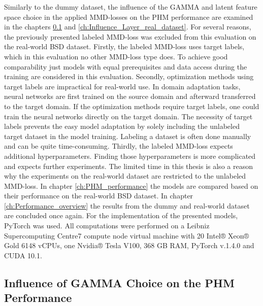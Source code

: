 Similarly to the dummy dataset, the influence of the GAMMA and latent feature space choice in the applied MMD-losses on the PHM performance are examined in the chapters \ref{ch:Influence_GAMMA_real_dataset} and \ref{ch:Influence_Layer_real_dataset}. For several reasons, the previously presented labeled MMD-loss was excluded from this evaluation on the real-world BSD dataset. Firstly, the labeled MMD-loss uses target labels, which in this evaluation no other MMD-loss type does. To achieve good comparability just models with equal prerequisites and data access during the training are considered in this evaluation. Secondly, optimization methods using target labels are impractical for real-world use. In domain adaptation tasks, neural networks are first trained on the source domain and afterward transferred to the target domain. If the optimization methods require target labels, one could train the neural networks directly on the target domain. The necessity of target labels prevents the easy model adaptation by solely including the unlabeled target dataset in the model training. Labeling a dataset is often done manually and can be quite time-consuming. Thirdly, the labeled MMD-loss expects additional hyperparameters. Finding those hyperparameters is more complicated and expects further experiments. The limited time in this thesis is also a reason why the experiments on the real-world dataset are restricted to the unlabeled MMD-loss. In chapter \ref{ch:PHM_performance} the models are compared based on their performance on the real-world BSD dataset. In chapter \ref{ch:Performance_overview} the results from the dummy and real-world dataset are concluded once again. For the implementation of the presented models, PyTorch was used. All computations were performed on a Leibniz Supercomputing Centre7 compute node virtual machine with 20 Intel® Xeon® Gold 6148 vCPUs, one Nvidia® Tesla V100, 368 GB RAM, PyTorch v.1.4.0 and CUDA 10.1.


\subsection{Influence of GAMMA Choice on the PHM Performance}\label{ch:Influence_GAMMA_real_dataset}

